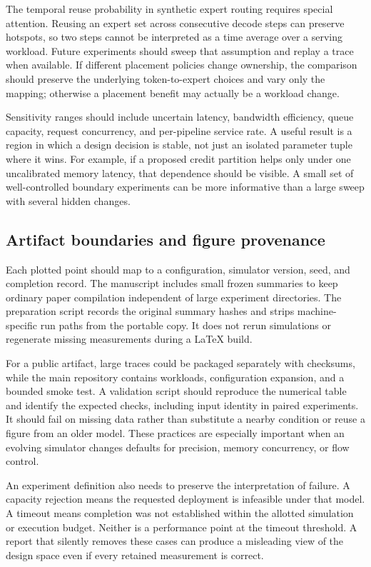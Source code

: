 The temporal reuse probability in synthetic expert routing requires special attention. Reusing an expert set across consecutive decode steps can preserve hotspots, so two steps cannot be interpreted as a time average over a serving workload. Future experiments should sweep that assumption and replay a trace when available. If different placement policies change ownership, the comparison should preserve the underlying token-to-expert choices and vary only the mapping; otherwise a placement benefit may actually be a workload change.

Sensitivity ranges should include uncertain latency, bandwidth efficiency, queue capacity, request concurrency, and per-pipeline service rate. A useful result is a region in which a design decision is stable, not just an isolated parameter tuple where it wins. For example, if a proposed credit partition helps only under one uncalibrated memory latency, that dependence should be visible. A small set of well-controlled boundary experiments can be more informative than a large sweep with several hidden changes.

\subsection{Artifact boundaries and figure provenance}
Each plotted point should map to a configuration, simulator version, seed, and completion record. The manuscript includes small frozen summaries to keep ordinary paper compilation independent of large experiment directories. The preparation script records the original summary hashes and strips machine-specific run paths from the portable copy. It does not rerun simulations or regenerate missing measurements during a LaTeX build.

For a public artifact, large traces could be packaged separately with checksums, while the main repository contains workloads, configuration expansion, and a bounded smoke test. A validation script should reproduce the numerical table and identify the expected checks, including input identity in paired experiments. It should fail on missing data rather than substitute a nearby condition or reuse a figure from an older model. These practices are especially important when an evolving simulator changes defaults for precision, memory concurrency, or flow control.

An experiment definition also needs to preserve the interpretation of failure. A capacity rejection means the requested deployment is infeasible under that model. A timeout means completion was not established within the allotted simulation or execution budget. Neither is a performance point at the timeout threshold. A report that silently removes these cases can produce a misleading view of the design space even if every retained measurement is correct.
